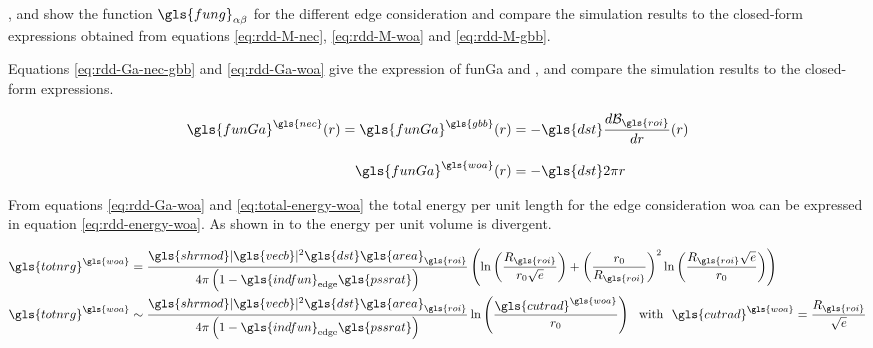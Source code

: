 \bigskip

,  and  show the function \( \gls{fung}_{\alpha \beta} \) for the different edge consideration and compare the simulation results to the closed-form expressions obtained from equations \eqref{eq:rdd-M-nec}, \eqref{eq:rdd-M-woa} and \eqref{eq:rdd-M-gbb}.

%
%
%

\bigskip \bigskip

Equations \eqref{eq:rdd-Ga-nec-gbb} and \eqref{eq:rdd-Ga-woa} give the expression of \gls{funGa} and ,  and  compare the simulation results to the closed-form expressions.

\begin{align}
  \gls{funGa}^{\gls{nec}} (r) =
  \gls{funGa}^{\gls{gbb}} (r) &=
    - \gls{dst} \frac{d \mathcal{B}_{\gls{roi}}}{dr}(r)
    \label{eq:rdd-Ga-nec-gbb}
  \\[3mm]
  \gls{funGa}^{\gls{woa}} (r) &=
    - \gls{dst} 2 \pi r
    \label{eq:rdd-Ga-woa}
\end{align}

%
%
%

\newpage

From equations \eqref{eq:rdd-Ga-woa} and \eqref{eq:total-energy-woa} the total energy per unit length for the edge consideration \gls{woa} can be expressed in equation \eqref{eq:rdd-energy-woa}.
As shown in  to  the energy per unit volume is divergent.

\begin{align}
  \gls{totnrg}^{\gls{woa}} &=
    \frac{\gls{shrmod} | \gls{vecb} |^2 \gls{dst} \gls{area}_{\gls{roi}}}{4 \pi \left(1 - \gls{indfun}_{\mathrm{edge}} \gls{pssrat} \right)} \left( \ln \left( \frac{R_{\gls{roi}}}{r_0 \sqrt{e}} \right) + \left( \frac{r_0}{R_{\gls{roi}}} \right)^2 \ln \left( \frac{R_{\gls{roi}} \sqrt{e}}{r_0} \right) \right)
  \\
  \gls{totnrg}^{\gls{woa}} &\sim
    \frac{\gls{shrmod} | \gls{vecb} |^2 \gls{dst} \gls{area}_{\gls{roi}}}{4 \pi \left(1 - \gls{indfun}_{\mathrm{edge}} \gls{pssrat} \right)} \ln \left( \frac{\gls{cutrad}^{\gls{woa}}}{r_0} \right) \ \ \text{with} \ \ \gls{cutrad}^{\gls{woa}} = \frac{R_{\gls{roi}}}{\sqrt{e}}
    \label{eq:rdd-energy-woa}
\end{align}

